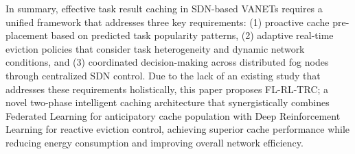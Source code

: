 In summary, effective task result caching in SDN-based VANETs requires a unified framework that addresses three key requirements: (1) proactive cache pre-placement based on predicted task popularity patterns, (2) adaptive real-time eviction policies that consider task heterogeneity and dynamic network conditions, and (3) coordinated decision-making across distributed fog nodes through centralized SDN control. Due to the lack of an existing study that addresses these requirements holistically, this paper proposes FL-RL-TRC; a novel two-phase intelligent caching architecture that synergistically combines Federated Learning for anticipatory cache population with Deep Reinforcement Learning for reactive eviction control, achieving superior cache performance while reducing energy consumption and improving overall network efficiency.
